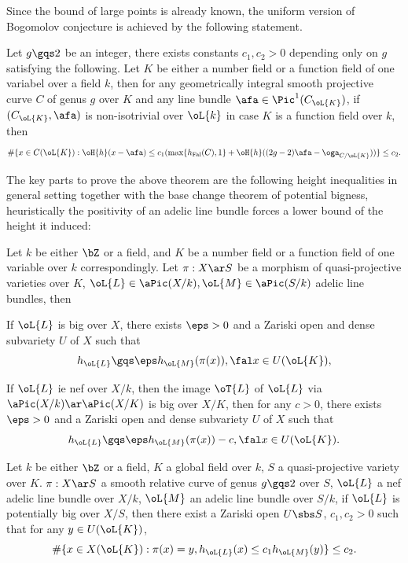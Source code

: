 \documentclass[a4paper, twoside]{article}
\begin{document}
Since the bound of large points is already known, the uniform version of Bogomolov conjecture is achieved by the following statement.
\begin{thm}
	Let $g\gqs2$ be an integer, there exists constants $c_{1},c_{2}>0$ depending only on $g$ satisfying the following. Let $K$ be either a number field or a function field of one variabel over a field $k$, then for any geometrically integral smooth projective curve $C$ of genus $g$ over $K$ and any line bundle $\afa\in\Pic^{1}(C_{\oL{K}})$, if $(C_{\oL{K}},\afa)$ is non-isotrivial over $\oL{k}$ in case $K$ is a function field over $k$, then
	\[
		\#\{x\in C(\oL{K}):\oH{h}(x-\afa)\leq c_{1}(\max\{h_{\mathrm{Fal}}(C),1\}+\oH{h}((2g-2)\afa-\oga_{C/\oL{K}}))\}\leq c_{2}.
	\]
\end{thm}


The key parts to prove the above theorem are the following height inequalities in general setting together with the base change theorem of potential bigness, heuristically the positivity of an adelic line bundle forces a lower bound of the height it induced:
\begin{thm}[{\cite[Theorem~5.3.5]{YZ2021}}]
	Let $k$ be either $\bZ$ or a field, and $K$ be a number field or a function field of one variable over $k$ correspondingly. Let $\pi:X\ar S$ be a morphism of quasi-projective varieties over $K$, $\oL{L}\in\aPic(X/k),\oL{M}\in\aPic(S/k)$ adelic line bundles, then
	\begin{enr}
		\item If $\oL{L}$ is big over $X$, there exists $\eps>0$ and a Zariski open and dense subvariety $U$ of $X$ such that
		\[
			h_{\oL{L}}\gqs\eps h_{\oL{M}}(\pi(x)), \fal x\in U(\oL{K}),
		\]
		\item If $\oL{L}$ ie nef over $X/k$, then the image $\oT{L}$ of $\oL{L}$ via $\aPic(X/k)\ar\aPic(X/K)$ is big over $X/K$, then for any $c>0$, there exists $\eps>0$ and a Zariski open and dense subvariety $U$ of $X$ such that
		\[
			h_{\oL{L}}\gqs\eps h_{\oL{M}}(\pi(x))-c, \fal x\in U(\oL{K}).
		\]
	\end{enr}
\end{thm}

\begin{thm}
	Let $k$ be either $\bZ$ or a field, $K$ a global field over $k$, $S$ a quasi-projective variety over $K$. $\pi:X\ar S$ a smooth relative curve of genus $g\gqs2$ over $S$, $\oL{L}$ a nef adelic line bundle over $X/k$, $\oL{M}$ an adelic line bundle over $S/k$, if $\oL{L}$ is potentially big over $X/S$, then there exist a Zariski open $U\sbs S$, $c_{1},c_{2}>0$ such that for any $y\in U(\oL{K})$,
	\[
		\#\{x\in X(\oL{K}):\pi(x)=y, h_{\oL{L}}(x)\leq c_{1}h_{\oL{M}}(y)\}\leq c_{2}.
	\]
\end{thm}
\end{document}
